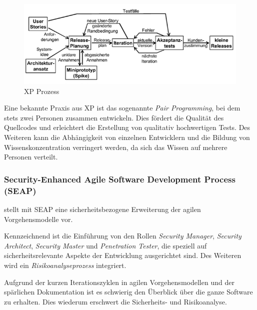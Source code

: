 \begin{figure}
  \centering
  \includegraphics[width=\textwidth]{img/xpmodell.png}
  \caption{XP Prozess \parencite[][]{Schatten:2010aa}}
  \label{fig:xpmodell}
\end{figure}

Eine bekannte Praxis aus XP ist das sogenannte \emph{Pair Programming}, bei dem stets zwei Personen zusammen entwickeln.
Dies fördert die Qualität des Quellcodes und erleichtert die Erstellung von qualitativ hochwertigen Tests.
Des Weiteren kann die Abhängigkeit von einzelnen Entwicklern und die Bildung von Wissenskonzentration verringert werden, da sich das Wissen auf mehrere Personen verteilt.

\subsubsection{Security-Enhanced Agile Software Development Process (SEAP)}

\parencite[Vgl.][]{Baca:2015aa} stellt mit SEAP eine sicherheitsbezogene Erweiterung der agilen Vorgehensmodelle vor.

Kennzeichnend ist die Einführung von den Rollen \emph{Security Manager}, \emph{Security Architect}, \emph{Security Master} und \emph{Penetration Tester}, die speziell auf sicherheitsrelevante Aspekte der Entwicklung ausgerichtet sind.
Des Weiteren wird ein \emph{Risikoanalyseprozess} integriert.

Aufgrund der kurzen Iterationszyklen in agilen Vorgehensmodellen und der spärlichen Dokumentation ist es schwierig den Überblick über die ganze Software zu erhalten.
Dies wiederum erschwert die Sicherheits- und Risikoanalyse.

